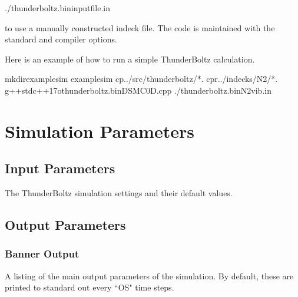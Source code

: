 \documentclass[letterpaper,10pt,english,openany,oneside]{sphinxmanual}
\begin{document}
\begin{sphinxVerbatim}[commandchars=\\\{\}]
./thunderboltz.bininputfile.in
\end{sphinxVerbatim}

\sphinxAtStartPar
to use a manually constructed indeck file. The code is
maintained with the standard  and 
compiler options.

\sphinxAtStartPar
Here is an example of how to run a simple ThunderBoltz calculation.

\begin{sphinxVerbatim}[commandchars=\\\{\}]
mkdirexample\PYGZus{}sim
example\PYGZus{}sim
cp../src/thunderboltz/*.
cp\PYGZhy{}r../indecks/N2/*.
g++\PYGZhy{}stdc++17\PYGZhy{}othunderboltz.binDSMC0D.cpp
./thunderboltz.binN2vib.in
\end{sphinxVerbatim}


\chapter{Simulation Parameters}
\label{\detokenize{short_index:simulation-parameters}}

\section{Input Parameters}
The ThunderBoltz simulation settings and their
default values.

\def \roottables {.} %



\section{Output Parameters}

\subsection{Banner Output}
A listing of the main output parameters of the simulation. By
default, these are printed to standard out every ``OS" time
steps.
\end{document}
